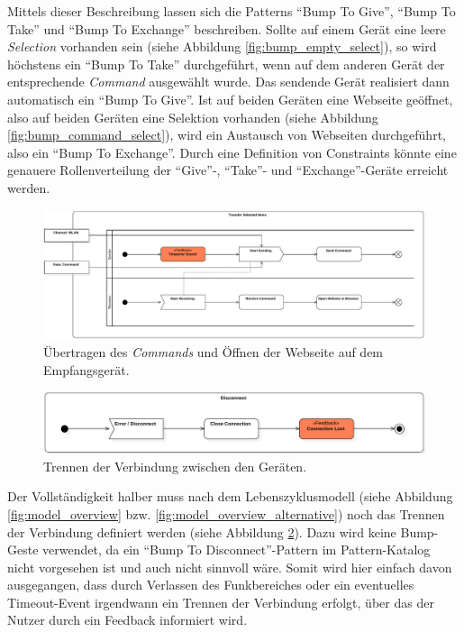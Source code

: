 Mittels dieser Beschreibung lassen sich die Patterns "`Bump To Give"', "`Bump To Take"' und "`Bump To Exchange"' beschreiben. Sollte auf einem Gerät eine leere \textit{Selection} vorhanden sein (siehe Abbildung \ref{fig:bump_empty_select}), so wird höchstens ein "`Bump To Take"' durchgeführt, wenn auf dem anderen Gerät der entsprechende \textit{Command} ausgewählt wurde. Das sendende Gerät realisiert dann automatisch ein "`Bump To Give"'. Ist auf beiden Geräten eine Webseite geöffnet, also auf beiden Geräten eine Selektion vorhanden (siehe Abbildung \ref{fig:bump_command_select}), wird ein Austausch von Webseiten durchgeführt, also ein "`Bump To Exchange"'. Durch eine Definition von Constraints könnte eine genauere Rollenverteilung der "`Give"'-, "`Take"'- und "`Exchange"'-Geräte erreicht werden.

\begin{figure}[h]
\centering
\includegraphics[page=1,width=\textwidth]{bilder/bump/transfer}
\caption{Übertragen des \textit{Commands} und Öffnen der Webseite auf dem Empfangsgerät.}
\label{fig:bump_transfer_selection}
\end{figure}

\begin{figure}[h]
\centering
\includegraphics[width=1\textwidth]{bilder/bump/disconnect}
\caption{Trennen der Verbindung zwischen den Geräten.}
\label{fig:bump_disconnect}
\end{figure}

Der Vollständigkeit halber muss nach dem Lebenszyklusmodell (siehe Abbildung \ref{fig:model_overview} bzw. \ref{fig:model_overview_alternative}) noch das Trennen der Verbindung definiert werden (siehe Abbildung \ref{fig:bump_disconnect}). Dazu wird keine Bump-Geste verwendet, da ein "`Bump To Disconnect"'-Pattern im Pattern-Katalog nicht vorgesehen ist und auch nicht sinnvoll wäre. Somit wird hier einfach davon ausgegangen, dass durch Verlassen des Funkbereiches oder ein eventuelles Timeout-Event irgendwann ein Trennen der Verbindung erfolgt, über das der Nutzer durch ein Feedback informiert wird. 

